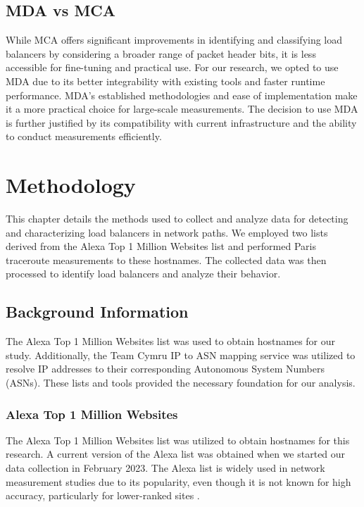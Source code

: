 \documentclass[12pt]{cwru_thesis}
\begin{document}
\section{MDA vs MCA}

While MCA offers significant improvements in identifying and classifying load balancers by considering a broader range of packet header bits, it is less accessible for fine-tuning and practical use. For our research, we opted to use MDA due to its better integrability with existing tools and faster runtime performance. MDA's established methodologies and ease of implementation make it a more practical choice for large-scale measurements. The decision to use MDA is further justified by its compatibility with current infrastructure and the ability to conduct measurements efficiently. 
\chapter{Methodology}

This chapter details the methods used to collect and analyze data for detecting and characterizing load balancers in network paths. We employed two lists derived from the Alexa Top 1 Million Websites list and performed Paris traceroute measurements to these hostnames. The collected data was then processed to identify load balancers and analyze their behavior.

\section{Background Information}

The Alexa Top 1 Million Websites list was used to obtain hostnames for our study. Additionally, the Team Cymru IP to ASN mapping service was utilized to resolve IP addresses to their corresponding Autonomous System Numbers (ASNs). These lists and tools provided the necessary foundation for our analysis.

\subsection{Alexa Top 1 Million Websites}

The Alexa Top 1 Million Websites list was utilized to obtain hostnames for this research. A current version of the Alexa list was obtained when we started our data collection in February 2023. The Alexa list is widely used in network measurement studies due to its popularity, even though it is not known for high accuracy, particularly for lower-ranked sites \cite{Alexa}.
\end{document}
